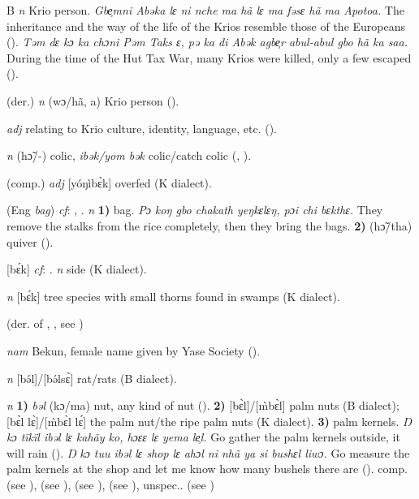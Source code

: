 \begin{letter}{B}
 \textit{n} Krio person. \textit{Gbe̹mni Abəka lɛ ni nche ma hã lɛ ma fəsɛ hã ma Apotoa.} The inheritance and the way of the life of the Krios resemble those of the Europeans (\citealt{Pichl1967}). \textit{Təm dɛ kɔ ka chɔni Pəm Taks ɛ, pə ka di Abək agbe̹r abul-abul gbo hã ka saa.} During the time of the Hut Tax War, many Krios were killed, only a few escaped (\citealt{Pichl1967}). 

 (der.) \textit{n} (wɔ/hã, a) Krio person (\citealt{Pichl1967}).

 \textit{adj} relating to Krio culture, identity, language, etc. (\citealt{Pichl1967}). 

 \textit{n} (hɔ̃/-) colic, \textit{ibək/yom bək} colic/catch colic (\citealt{Pichl1967}, \citealt{Sumner1921}).

 (comp.) \textit{adj} [yóŋìbɛ̀k] overfed (K dialect). 

 (Eng \textit{bag}) \textit{cf}: , . \textit{n} \textbf{1)} bag. \textit{Pɔ koŋ gbo chakath yeŋkɛlɛŋ, pɔi chi bɛkthɛ.} They remove the stalks from the rice completely, then they bring the bags. \textbf{2)} (hɔ̃/tha) quiver (\citealt{Pichl1967}). 



 [bɛ́k] \textit{cf}: . \textit{n} side (K dialect). 

 \textit{n} [bɛ́k] tree species with small thorns found in swamps (K dialect).

 (der. of , , see ) 

 \textit{nam} Bekun, female name given by Yase Society (\citealt{Pichl1967}). 

 \textit{n} [bə́l]/[bə́lsɛ̀] rat/rats (B dialect). 

 \textit{n} \textbf{1)} \textit{bəl} (kɔ/ma) nut, any kind of nut (\citealt{Pichl1967}). \textbf{2)} [bɛ̀l]/[\`{m}bɛ̀l] palm nuts (B dialect); [bɛ̀l lɛ̀]/[\`{m}bɛ̀l lɛ́] the palm nut/the ripe palm nuts (K dialect). \textbf{3)} palm kernels. \textit{Ŋ kɔ tïkïl ibəl lɛ kahãy ko, hɔɛɛ lɛ yema le̹l.} Go gather the palm kernels outside, it will rain (\citealt{Pichl1967}). \textit{Ŋ kɔ tuu ibəl lɛ shop lɛ ahɔl ni nhã ya si bushɛl liwɔ.} Go measure the palm kernels at the shop and let me know how many bushels there are (\citealt{Pichl1967}). comp.  (see ),  (see ),  (see ),  (see ), unspec..  (see ) 


\end{letter}
